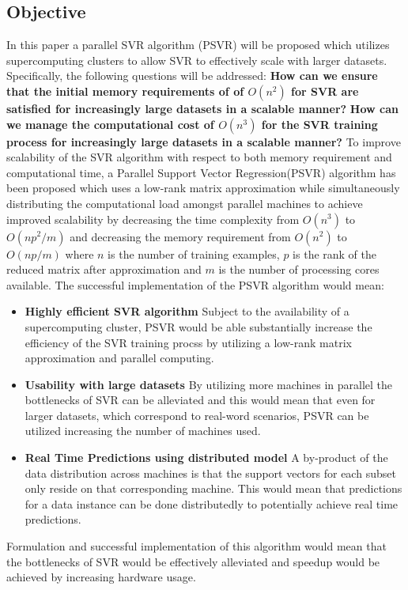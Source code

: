 \documentclass[12pt]{article}
\begin{document}
\subsection{Objective}
In this paper a parallel SVR algorithm (PSVR) will be proposed which utilizes supercomputing clusters to allow SVR to effectively scale with larger datasets.
Specifically, the following questions will be addressed:
\newline\newline
\setlength{\leftskip}{3cm}
{\bf How can we ensure that the initial memory requirements of of $O(n^2)$ for SVR are satisfied for increasingly large datasets in a scalable manner?}
\newline\newline
{\bf How can we manage the computational cost of $O(n^3)$ for the SVR training process for increasingly large datasets in a scalable manner?}
\setlength{\leftskip}{0pt}
\newline\newline
To improve scalability of the SVR algorithm with respect to both memory requirement and computational time, a Parallel Support Vector Regression(PSVR) algorithm has been proposed which uses a low-rank matrix approximation while simultaneously distributing the computational load amongst parallel machines to achieve improved scalability by decreasing the time complexity from $O(n^3)$ to $O(np^2/m)$ and decreasing the memory requirement from $O(n^2)$ to $O(np/m)$ where $n$ is the number of training examples, $p$ is the rank of the reduced matrix after approximation and $m$ is the number of processing cores available.
\newline\newline
The successful implementation of the PSVR algorithm would mean:
\begin{itemize}
\item {\bf Highly efficient SVR algorithm} 
Subject to the availability of a supercomputing cluster, PSVR would be able substantially increase the efficiency of the SVR training procss by utilizing a low-rank matrix approximation and parallel computing.
\item {\bf Usability with large datasets} By utilizing more machines in parallel the bottlenecks of SVR can be alleviated and this would mean that even for larger datasets, which correspond to real-word scenarios, PSVR can be utilized increasing the number of machines used.
\item {\bf Real Time Predictions using distributed model} A by-product of the data distribution across machines is that the support vectors for each subset only reside on that corresponding machine. This would mean that predictions for a data instance can be done distributedly to potentially achieve real time predictions.
\end{itemize}
Formulation and successful implementation of this algorithm would mean that the bottlenecks of SVR would be effectively alleviated and speedup would be achieved by increasing hardware usage.
\end{document}
